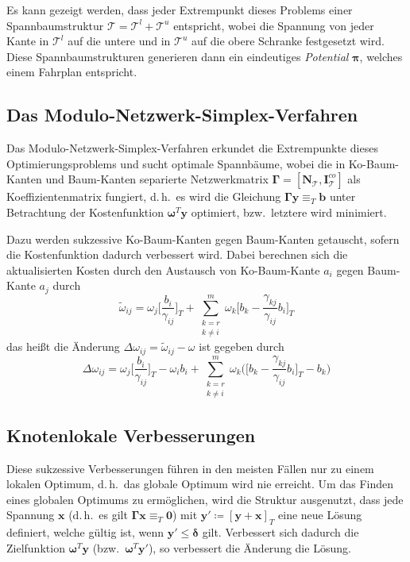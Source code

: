 \documentclass[a4paper, 10pt, twocolumn]{scrartcl}
\newcommand{\mat}[1]{\boldsymbol{#1}}
\renewcommand{\vec}[1]{\boldsymbol{#1}}
\newcommand{\bzw}{bzw.~}
\renewcommand{\dh}{d.\,h.~}
\begin{document}
			Es kann gezeigt werden, dass jeder Extrempunkt dieses Problems einer Spannbaumstruktur \( \mathcal{T} = \mathcal{T}^l + \mathcal{T}^u \) entspricht, wobei die Spannung von jeder Kante in \( \mathcal{T}^l \) auf die untere und in \( \mathcal{T}^u \) auf die obere Schranke festgesetzt wird. Diese Spannbaumstrukturen generieren dann ein eindeutiges \emph{Potential}  \(\vec{\pi}\), welches einem Fahrplan entspricht.
	
	\subsection*{Das Modulo-Netzwerk-Simplex-Verfahren}
		Das Modulo-Netzwerk-Simplex-Verfahren erkundet die Extrempunkte dieses Optimierungsproblems und sucht optimale Spannbäume, wobei die in Ko-Baum-Kanten und Baum-Kanten separierte Netzwerkmatrix \( \mat{\Gamma} = [\mat{N}_\mathcal{T}, \mat{I}_\mathcal{T}^\mathit{co}] \) als Koeffizientenmatrix fungiert, \dh es wird die Gleichung \( \mat{\Gamma} \vec{y} \equiv_T \vec{b} \) unter Betrachtung der Kostenfunktion \( \vec{\omega}^T \vec{y} \) optimiert, \bzw letztere wird minimiert.
		
		Dazu werden sukzessive Ko-Baum-Kanten gegen Baum-Kanten getauscht, sofern die Kostenfunktion dadurch verbessert wird. Dabei berechnen sich die aktualisierten Kosten durch den Austausch von Ko-Baum-Kante \( a_i \) gegen Baum-Kante \( a_j \) durch
		\begin{equation*}
			\tilde{\omega}_{ij} = \omega_j \bigg[ \frac{b_i}{\gamma_{ij}} \bigg]_T \! + \sum_{\substack{k = r \\ k \neq i}}^{m} \omega_k \bigg[ b_k - \frac{\gamma_{kj}}{\gamma_{ij}} b_i \bigg]_T
		\end{equation*}
		das heißt die Änderung \( \Delta\omega_{ij} = \tilde{\omega}_{ij} - \omega \) ist gegeben durch
		\begin{equation*}
			\Delta\omega_{ij} = \omega_j \bigg[ \frac{b_i}{\gamma_{ij}} \bigg]_T \! - \omega_i b_i + \sum_{\substack{k = r \\ k \neq i}}^{m} \omega_k \Bigg( \bigg[ b_k - \frac{\gamma_{kj}}{\gamma_{ij}} b_i \bigg]_T - b_k \Bigg)
		\end{equation*}
	
	\subsection*{Knotenlokale Verbesserungen}
		Diese sukzessive Verbesserungen führen in den meisten Fällen nur zu einem lokalen Optimum, \dh das globale Optimum wird nie erreicht. Um das Finden eines globalen Optimums zu ermöglichen, wird die Struktur ausgenutzt, dass jede Spannung \(\vec{x}\) (\dh es gilt \( \mat{\Gamma} \vec{x} \equiv_T \vec{0} \)) mit \( \vec{y}' \coloneqq [\vec{y} + \vec{x}]_T \) eine neue Lösung definiert, welche gültig ist, wenn \( \vec{y}' \leq \vec{\delta} \) gilt. Verbessert sich dadurch die Zielfunktion \( \vec{\omega}^T \vec{y} \) (\bzw \( \vec{\omega}^T \vec{y}' \)), so verbessert die Änderung die Lösung.
\end{document}
